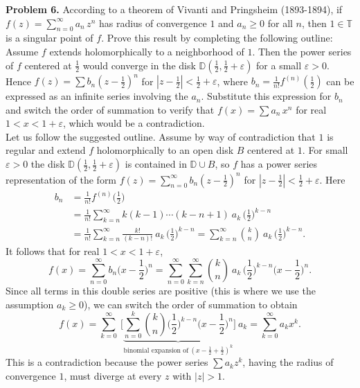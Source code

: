 \documentclass[12pt]{amsart}
\newcommand{\ve}{\varepsilon}
\newcommand{\TT}{{\mathbb T}}
\newcommand{\DD}{{\mathbb D}}
\newcommand{\vs}{\vspace{2mm}}
\begin{document}
\noindent
{\bf Problem 6.} According to a theorem of Vivanti and Pringsheim (1893-1894), if $f(z)=\sum_{n=0}^\infty a_n \, z^n$ has radius of convergence $1$ and $a_n \geq 0$ for all $n$, then $1 \in \TT$ is a singular point of $f$. Prove this result by completing the following outline: Assume $f$ extends holomorphically to a neighborhood of $1$. Then the power series of $f$ centered at $\tfrac{1}{2}$ would converge in the disk $\DD(\tfrac{1}{2},\tfrac{1}{2}+\ve)$ for a small $\ve>0$. Hence  $f(z)=\sum b_n (z-\tfrac{1}{2})^n$ for $|z-\tfrac{1}{2}|<\frac{1}{2}+\ve$, where $b_n=\tfrac{1}{n!} f^{(n)}(\tfrac{1}{2})$ can be expressed as an infinite series involving the $a_n$. Substitute this expression for $b_n$ and switch the order of summation to verify that $f(x)=\sum a_n \, x^n$ for real $1<x<1+\ve$, which would be a contradiction. \vs \\
Let us follow the suggested outline. Assume by way of contradiction that $1$ is regular and extend $f$ holomorphically to an open disk $B$ centered at $1$. For small $\ve>0$ the disk $\DD(\tfrac{1}{2},\tfrac{1}{2}+\ve)$ is contained in $\DD \cup B$, so $f$ has a power series representation of the form $f(z)=\sum_{n=0}^{\infty} b_n (z-\tfrac{1}{2})^n$ for $|z-\tfrac{1}{2}|<\frac{1}{2}+\ve$. Here 
\begin{align*}
b_n & = \frac{1}{n!} f^{(n)}\Big(\frac{1}{2}\Big) \\
& = \frac{1}{n!} \sum_{k=n}^{\infty} k(k-1)\cdots (k-n+1) \ a_k \, \Big( \frac{1}{2} \Big)^{k-n} \\
& = \frac{1}{n!} \sum_{k=n}^{\infty} \frac{k!}{(k-n)!} \ a_k \, \Big( \frac{1}{2} \Big)^{k-n} = \sum_{k=n}^{\infty} {k \choose n} \ a_k \, \Big( \frac{1}{2} \Big)^{k-n}. 
\end{align*}
It follows that for real $1<x<1+\ve$,
$$
f(x) = \sum_{n=0}^{\infty} b_n \Big(x-\frac{1}{2} \Big)^n = \sum_{n=0}^{\infty} \sum_{k=n}^{\infty} {k \choose n} \ a_k \, \Big( \frac{1}{2} \Big)^{k-n} \Big(x-\frac{1}{2} \Big)^n.
$$
Since all terms in this double series are positive (this is where we use the assumption $a_k \geq 0$), we can switch the order of summation to obtain 
$$
f(x) = \sum_{k=0}^{\infty} \ \Big[ \underbrace{\sum_{n=0}^k {k \choose n} \Big( \frac{1}{2} \Big)^{k-n} \Big(x-\frac{1}{2} \Big)^n}_{\text{binomial expansion of} \ (x-\tfrac{1}{2}+\tfrac{1}{2})^k} \Big] \ a_k = \sum_{k=0}^{\infty} a_k x^k.
$$
This is a contradiction because the power series $\sum a_k z^k$, having the radius of convergence $1$, must diverge at every $z$ with $|z|>1$.   
\end{document}
